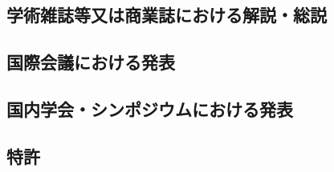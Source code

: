 \documentclass[11pt,a4paper,uplatex,twoside,dvipdfmx]{ujarticle} 	%
\renewcommand{\bf}{\bfseries\sffamily\gtfamily}
\newcommand{\研究課題名}{\mgfamily ストカスティックインフレーション, 原始ブラックホール, および重力波観測}
\newcommand{\研究機関名}{\mgfamily 名古屋大学}
\newcommand{\申請者氏名}{\mgfamily 多田 祐一郎}
\newcommand{\研究代表者氏名}{\申請者氏名}
\newcommand{\研究期間の最終元号年度}{34}	%
\begin{document}
\subsection{学術雑誌等又は商業誌における解説・総説}
\newcommand{\学術雑誌等または商業誌における解説や総説}{%
	\begin{enumerate}
		\item R.~Kipling, \underline{H. Yukawa},
				``The Elephant's Child (象の鼻はなぜ長い)'', 
				Nature, {\bf 999}, 777-779, (2003).
	\end{enumerate}
	他２件
}

\subsection{国際会議における発表}
\newcommand{\国際会議における発表}{%
	\begin{enumerate}
		\item $\circ$ 湯川秀樹、
			``Theory of Elephant Eggs'', 
			原始殻物理国際会議、
			カラチ、2006年2月

	\end{enumerate}
	他１件
}

\subsection{国内学会・シンポジウムにおける発表}
\newcommand{\国内学会やシンポジウムにおける発表}{%
	\begin{enumerate}
		\item $\circ$ 湯川秀樹、朝永振一郎、
			「ほ乳類の真の意味」、
			ほ乳類学会、
			東京、2003年6月
	\end{enumerate}
	他３件
}

\subsection{特許}
\newcommand{\特許等}{%
	\begin{enumerate}
		\item[](公開中)
		\item 800800号、「クジラの卵を用いた深海潜水艇」\underline{湯川秀樹}、2003年4月
	\end{enumerate}		
}
\end{document}
